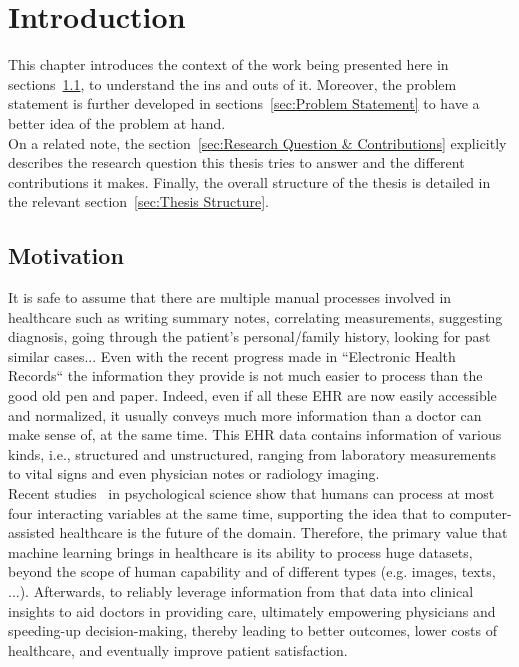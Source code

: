 \chapter{Introduction}
\label{chap:Introduction}
This chapter introduces the context of the work being presented here in sections~\ref{sec:Motivation}, to understand the ins and outs of it. Moreover, the problem statement is further developed in sections~\ref{sec:Problem Statement} to have a better idea of the problem at hand. \\
On a related note, the section~\ref{sec:Research Question & Contributions} explicitly describes the research question this thesis tries to answer and the different contributions it makes. Finally, the overall structure of the thesis is detailed in the relevant section~\ref{sec:Thesis Structure}.
\section{Motivation}
\label{sec:Motivation}
It is safe to assume that there are multiple manual processes involved in healthcare such as writing summary notes, correlating measurements, suggesting diagnosis, going through the patient's personal/family history, looking for past similar cases... Even with the recent progress made in ``Electronic Health Records`` the information they provide is not much easier to process than the good old pen and paper. Indeed, even if all these EHR are now easily accessible and normalized, it usually conveys much more information than a doctor can make sense of, at the same time. This EHR data contains information of various kinds, i.e., structured and unstructured, ranging from laboratory measurements to vital signs and even physician notes or radiology imaging. \\

Recent studies~\cite{doi:10.1111/j.0956-7976.2005.00782.x} in psychological science show that humans can process at most four interacting variables at the same time, supporting the idea that to computer-assisted healthcare is the future of the domain. Therefore, the primary value that machine learning brings in healthcare is its ability to process huge datasets, beyond the scope of human capability and of different types (e.g. images, texts, ...). Afterwards, to reliably leverage information from that data into clinical insights to aid doctors in providing care, ultimately empowering physicians and speeding-up decision-making, thereby leading to better outcomes, lower costs of healthcare, and eventually improve patient satisfaction.

